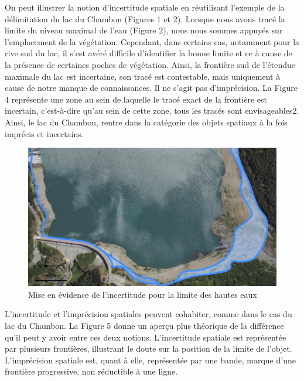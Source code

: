 On peut illustrer la notion d’incertitude spatiale en réutilisant
l’exemple de la délimitation du lac du Chambon (Figures 1 et
2). Lorsque nous avons tracé la limite du niveau maximal de l’eau
(Figure 2), nous nous sommes appuyés sur l’emplacement de la
végétation. Cependant, dans certains cas, notamment pour la rive sud
du lac, il s’est avéré difficile d’identifier la bonne limite et ce à
cause de la présence de certaines poches de végétation. Ainsi, la
frontière sud de l’étendue maximale du lac est incertaine, son tracé
est contestable, mais uniquement à cause de notre manque de
connaissances. Il ne s’agit pas d’imprécision. La Figure 4 représente
une zone au sein de laquelle le tracé exact de la frontière est
incertain, c’est-à-dire qu’au sein de cette zone, tous les tracés sont
envisageables2. Ainsi, le lac du Chambon, rentre dans la catégorie des
objets spatiaux à la fois imprécis et incertains.

\begin{figure}
  \centering
  \includegraphics{../figures/fig4.png}
  \caption{Mise en évidence de l'incertitude pour la limite des hautes
    eaux}
  \label{fig:lim_champ_inc}
\end{figure}

L’incertitude et l’imprécision spatiales peuvent cohabiter, comme dans
le cas du lac du Chambon. La Figure 5 donne un aperçu plus théorique
de la différence qu’il peut y avoir entre ces deux
notions. L’incertitude spatiale est représentée par plusieurs
frontières, illustrant le doute sur la position de la limite de
l’objet. L’imprécision spatiale est, quant à elle, représentée par une
bande, marque d’une frontière progressive, non réductible à une ligne.

